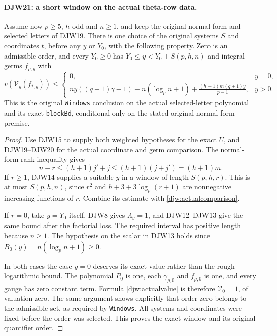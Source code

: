 \documentclass[11pt,a4paper]{article}
\numberwithin{equation}{section}
\theoremstyle{remark}\newtheorem{remark}[theorem]{Remark}
\begin{document}
\paragraph{DJW21: a short window on the actual theta-row data.}
\label{claim:DJW21}
Assume now $p\ge5$, $h$ odd and $n\ge1$, and keep the original
normal form and selected letters of DJW19.
There is one choice of the original systems $S$ and coordinates
$t$, before any $y$ or $Y_0$, with the following property.
Zero is an admissible order, and every $Y_0\ge0$ has
$Y_0\le y<Y_0+S(p,h,n)$ and integral germs $f_{\rho,y}$ with
\begin{equation}
 v(\mathcal V_y(f_{*,y}))\le
 \begin{cases}
 0,&y=0,\\[2pt]
 \displaystyle
 ny((q+1)\gamma-1)+n(\log_p n+1)
       +\frac{(h+1)m(q+1)y}{p-1},&y>0.
 \end{cases}
 \label{djw:actualwindow}
\end{equation}
This is the original \texttt{Windows} conclusion on the actual
selected-letter polynomial and its exact \texttt{block\allowbreak Bd},
conditional only on the stated original normal-form premise.

\begin{proof}
Use DJW15 to supply both weighted hypotheses for the exact $U$,
and DJW19--DJW20 for the actual coordinate and germ comparison.
The normal-form rank inequality gives
\[
 n-r\le(h+1)j'+j\le(h+1)(j+j')=(h+1)m.
\]
If $r\ge1$, DJW14 supplies a suitable $y$ in a window of length
$S(p,h,r)$.  This is at most $S(p,h,n)$, since $r^2$ and
$h+3+3\log_p(r+1)$ are nonnegative increasing functions of $r$.
Combine its estimate with \eqref{djw:actualcomparison}.

If $r=0$, take $y=Y_0$ itself.  DJW8 gives $\Lambda_y=1$,
and DJW12--DJW13 give the same bound after the factorial loss.
The required interval has positive length because $n\ge1$.
The hypothesis on the scalar in DJW13 holds since
$B_0(y)=n(\log_p n+1)\ge0$.

In both cases the case $y=0$ deserves its exact value rather than
the rough logarithmic bound.  The polynomial $P_0$ is one, each
$\gamma_{\rho,0}$ and $f_{\rho,0}$ is one, and every gauge
has zero constant term.  Formula \eqref{djw:actualvalue} is
therefore $\mathcal V_0=1$, of valuation zero.  The same argument
shows explicitly that order zero belongs to the admissible set,
as required by \texttt{Windows}.  All systems and coordinates
were fixed before the order was selected.  This proves the exact
window and its original quantifier order.
\end{proof}
\end{document}
